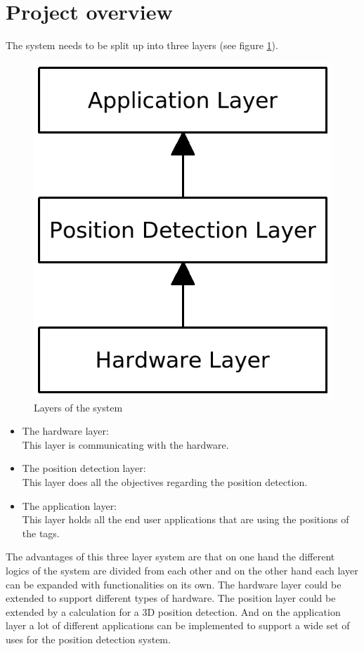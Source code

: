  \section{Project overview}
  \label{sec:analysis:ProjecSpec}
  The system needs to be split up into three layers (see figure \ref{fg:analysis:systemLayers}).
  \begin{figure}[h]
   \centering
   \includegraphics[scale=0.4]{Diagrams/systemLayers.png}
   \caption{Layers of the system}
   \label{fg:analysis:systemLayers}
  \end{figure}
  \begin{itemize}
   \item The hardware layer:\\
    This layer is communicating with the hardware.
   \item The position detection layer:\\
    This layer does all the objectives regarding the position detection.
   \item The application layer:\\
    This layer holds all the end user applications that are using the positions of the tags.
  \end{itemize}
  The advantages of this three layer system are that on one hand the different logics of the system are divided from each other and on the other hand each layer can be expanded with functionalities on its own. The hardware layer could be extended to support different types of hardware. The position layer could be extended by a calculation for a 3D position detection. And on the application layer a lot of different applications can be implemented to support a wide set of uses for the position detection system.

